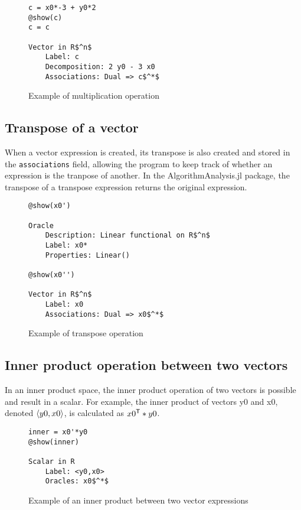 \begin{figure}[!h]
	\begin{lstlisting}[mathescape]
c = x0*-3 + y0*2
@show(c)
c = c

Vector in R$^n$
	Label: c
	Decomposition: 2 y0 - 3 x0
	Associations: Dual => c$^*$

	\end{lstlisting}
	\caption{Example of multiplication operation}
	\label{ex_scalar}
\end{figure}

\subsection*{Transpose of a vector}
When a vector expression is created, its transpose is also created and stored in the \texttt{associations} field, allowing the program to keep track of whether an expression is the tranpose of another. In the AlgorithmAnalysis.jl package, the transpose of a transpose expression returns the original expression.

\begin{figure}[!h]
	\begin{lstlisting}[mathescape]
@show(x0')

Oracle
	Description: Linear functional on R$^n$
	Label: x0*
	Properties: Linear()

@show(x0'')

Vector in R$^n$
	Label: x0
	Associations: Dual => x0$^*$
	\end{lstlisting}
	\caption{Example of transpose operation}
	\label{ex_transpose}
\end{figure}

\subsection*{Inner product operation between two vectors}
In an inner product space, the inner product operation of two vectors is possible and result in a scalar. For example, the inner product of vectors y0 and x0, denoted $\langle y0, x0 \rangle$, is calculated as $x0^{\mathsf{T}} * y0$.

\begin{figure}[!h]
	\begin{lstlisting}[mathescape]
inner = x0'*y0
@show(inner)

Scalar in R
	Label: <y0,x0>
	Oracles: x0$^*$

	\end{lstlisting}
	\caption{Example of an inner product between two vector expressions}
	\label{ex_inner}
\end{figure}

